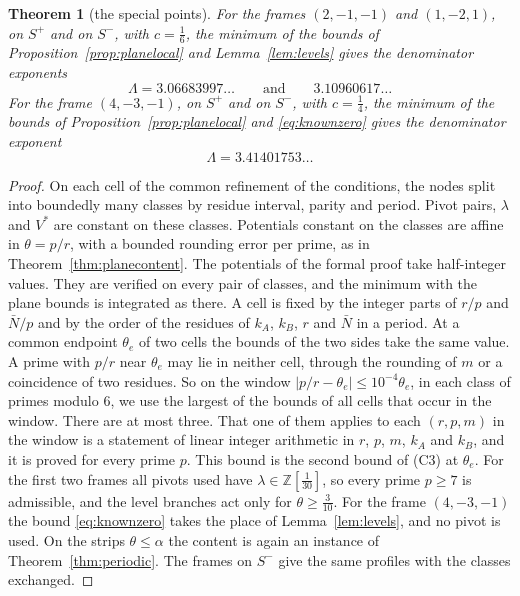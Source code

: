 \documentclass[11pt]{amsart}
\newtheorem{theorem}{Theorem}[section]
\theoremstyle{definition}
\theoremstyle{remark}
\numberwithin{equation}{section}
\newcommand{\Z}{\mathbb Z}
\begin{document}
\begin{theorem}[the special points]\label{thm:dips}
For the frames $(2,-1,-1)$ and $(1,-2,1)$, on $S^+$ and on $S^-$, with $c=\frac16$, the minimum of the bounds of
Proposition~\ref{prop:planelocal} and Lemma~\ref{lem:levels} gives the denominator exponents
\[
 \Lambda=3.06683997\ldots\qquad\text{and}\qquad 3.10960617\ldots
\]
For the frame $(4,-3,-1)$, on $S^+$ and on $S^-$, with $c=\frac14$, the minimum of the bounds of
Proposition~\ref{prop:planelocal} and \eqref{eq:knownzero} gives the denominator exponent
\[
 \Lambda=3.41401753\ldots
\]
\end{theorem}
\begin{proof}
On each cell of the common refinement of the conditions, the nodes split into boundedly many classes by residue
interval, parity and period. Pivot pairs, $\lambda$ and $V^*$ are constant on these classes. Potentials constant on the
classes are affine in $\theta=p/r$, with a bounded rounding error per prime, as in Theorem~\ref{thm:planecontent}. The
potentials of the formal proof take half-integer values. They are verified on every pair of classes, and the minimum with
the plane bounds is integrated as there. A cell is fixed by the integer parts of $r/p$ and $\bar N/p$
and by the order of the residues of $k_A$, $k_B$, $r$ and $\bar N$ in a period. At a common endpoint $\theta_e$ of two
cells the bounds of the two sides take the same value. A prime with $p/r$ near $\theta_e$ may lie in neither cell, through
the rounding of $m$ or a coincidence of two residues. So on the window $|p/r-\theta_e|\le10^{-4}\theta_e$, in each class of primes
modulo $6$, we use the largest of the bounds of all cells that occur in the window. There are at most three. That one of
them applies to each $(r,p,m)$ in the window is a statement of linear integer arithmetic in $r$, $p$, $m$, $k_A$ and
$k_B$, and it is proved for every prime $p$. This bound is the second bound of (C3) at $\theta_e$. For the first two
frames all pivots used have $\lambda\in\Z[\frac1{30}]$, so every prime $p\ge7$ is admissible, and the level branches act
only for $\theta\ge\frac3{10}$. For the frame $(4,-3,-1)$ the bound \eqref{eq:knownzero} takes the place of
Lemma~\ref{lem:levels}, and no pivot is used. On the strips $\theta\le\alpha$ the content is again an instance of
Theorem~\ref{thm:periodic}. The frames on $S^-$ give the same profiles with the classes exchanged.
\end{proof}
\end{document}
